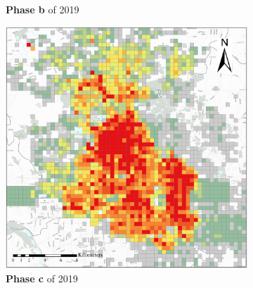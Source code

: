 \documentclass[preprints,ijgi,submit,moreauthors]{Definitions/mdpi}
\begin{document}
\begin{figure}[ht]
\begin{subfigure}{.28\textwidth}
        \caption{\textbf{Phase b} of 2019}\label{fig:p_b_2019}
    \end{subfigure}
    \begin{subfigure}{.28\textwidth}
        \includegraphics[width=\textwidth]{Figures/BSSPhase3_2019.eps}
        \caption{\textbf{Phase c} of 2019}\label{fig:p_c_2019}
    \end{subfigure}
    \begin{subfigure}{.14\textwidth}

\end{subfigure}
\end{figure}
\end{document}
